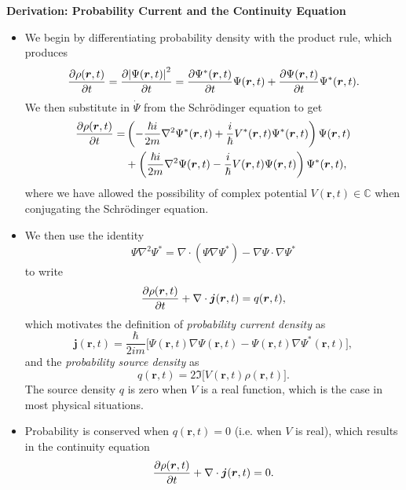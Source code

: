 \documentclass[11pt, a4paper]{article}
\renewcommand{\div}{\nabla \cdot}
\renewcommand{\grad}{\nabla}
\renewcommand{\laplacian}{\nabla^{2}}
\newcommand{\Schro}{Schr\"{o}dinger\xspace}
\renewcommand{\vec}[1]{\bm{#1}}  %
\renewcommand{\r}{\vec{r}}  %
\renewcommand{\P}{\Psi}  %
\begin{document}
\textbf{Derivation: Probability Current and the Continuity Equation}
\begin{itemize}

	\item We begin by differentiating probability density with the product rule, which produces
	\begin{equation*}
		  \pdv{\rho(\r, t)}{t} = \pdv{\abs{\P(\r, t)}^{2}}{t} = \pdv{\P^{*}(\r, t)}{t} \P(\r, t) + \pdv{\P(\r, t)}{t} \P^{*}(\r, t).
	\end{equation*}
	We then substitute in $ \dot{\P} $ from the \Schro equation to get
	\begin{align*}
		\pdv{\rho(\r, t)}{t} = &\left(- \frac{\hbar i}{2m}\laplacian \P^{*}(\r, t) + \frac{i}{\hbar} V^{*}(\r, t)\Psi^{*}(\r, t)\right)\P(\r, t) \\
		& + \left(\frac{\hbar i}{2m}\laplacian \P(\r, t) - \frac{i}{\hbar} V(\r, t)\Psi(\r, t)\right)\Psi^{*}(\r, t),
	\end{align*}
	where we have allowed the possibility of complex potential $ V(\r, t) \in \mathbb{C} $ when conjugating the \Schro equation. 

    \item We then use the identity
	\begin{equation*}
		\P \laplacian \P^{*} = \div (\P \grad \P^{*}) - \grad \P \cdot \grad \P^{*}
	\end{equation*}
	to write 
	\begin{equation*}
		\pdv{\rho(\r, t)}{t} + \div \vec{j}(\r, t) = q(\r, t),
	\end{equation*}
	which motivates the definition of \textit{probability current density} as
	\begin{equation*}
		\vec{j}(\r, t) = \frac{\hbar}{2im}\big[\P(\r, t)\grad\P(\r, t) - \P(\r, t)\grad\P^{*}(\r, t)\big],
	\end{equation*}
	and the \textit{probability source density} as
	\begin{equation*}
		q(\r, t) = 2 \Im \big[V(\r, t)\rho(\r, t)\big].
	\end{equation*}
	The source density $ q $ is zero when $ V $ is a real function, which is the case in most physical situations.
	
    \item Probability is conserved when $ q(\r, t) = 0 $ (i.e. when $ V $ is real), which results in the continuity equation
	\begin{equation*}
		\pdv{\rho(\r, t)}{t} + \div \vec{j}(\r, t) = 0.
	\end{equation*}
	
\end{itemize}
\end{document}
